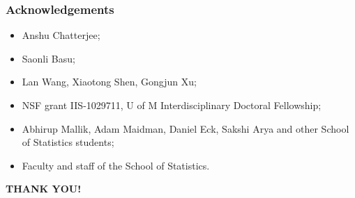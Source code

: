 \documentclass[handout,10pt]{beamer}
\begin{document}

\begin{frame}
\frametitle{Acknowledgements}

\begin{itemize}
\item Anshu Chatterjee;

\vspace{1em}
\item Saonli Basu;

\vspace{1em}
\item Lan Wang, Xiaotong Shen, Gongjun Xu;

\vspace{1em}
\item NSF grant IIS-1029711, U of M Interdisciplinary Doctoral Fellowship;

\vspace{1em}
\item Abhirup Mallik, Adam Maidman, Daniel Eck, Sakshi Arya and other School of Statistics students;

\vspace{1em}
\item Faculty and staff of the School of Statistics.
\end{itemize}
\end{frame}

\begin{frame}
\centering\huge
\textcolor{UniBlue}{\textbf{THANK YOU!}}
\end{frame}
\end{document}
